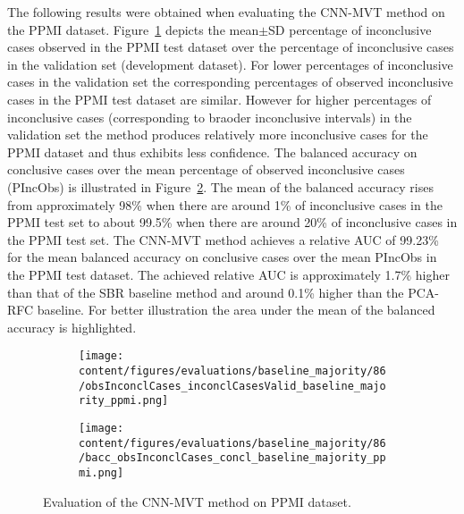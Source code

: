 The following results were obtained when evaluating the CNN-MVT method on the PPMI dataset.
Figure~\ref{fig:obsInconclCases_inconclCasesValid_baseline_majority_ppmi} depicts the
mean$\pm$SD percentage of inconclusive cases observed in the PPMI test dataset 
over the percentage of inconclusive cases in the validation set (development dataset).
For lower percentages of inconclusive cases in the validation set the corresponding 
percentages of observed inconclusive cases in the PPMI test dataset are similar.
However for higher percentages of inconclusive cases (corresponding to braoder inconclusive intervals) 
in the validation set the method produces relatively more inconclusive cases for the PPMI dataset 
and thus exhibits less confidence.
The balanced accuracy on conclusive cases over the mean percentage of observed inconclusive cases (PIncObs) is illustrated 
in Figure~\ref{fig:bacc_obsInconclCases_concl_baseline_majority_ppmi}.
The mean of the balanced accuracy rises from approximately 98\% 
when there are around 1\% of inconclusive cases in the PPMI test set to about 99.5\% 
when there are around 20\% of inconclusive cases in the PPMI test set.
The CNN-MVT method achieves a relative AUC of 99.23\% for the mean balanced accuracy on conclusive cases 
over the mean PIncObs in the PPMI test dataset.
The achieved relative AUC is approximately 1.7\% higher than that of the SBR baseline method 
and around 0.1\% higher than the PCA-RFC baseline.
For better illustration the area under the mean of the balanced accuracy is highlighted.


\begin{figure}[ht]
  \begin{subfigure}{0.9\textwidth}
    \centering
    \texttt{[image: content/figures/evaluations/baseline\_majority/86/obsInconclCases\_inconclCasesValid\_baseline\_majority\_ppmi.png]}
    \label{fig:obsInconclCases_inconclCasesValid_baseline_majority_ppmi}
  \end{subfigure}
  \hfill
  \begin{subfigure}{0.9\textwidth}
    \centering
    \texttt{[image: content/figures/evaluations/baseline\_majority/86/bacc\_obsInconclCases\_concl\_baseline\_majority\_ppmi.png]}
    \label{fig:bacc_obsInconclCases_concl_baseline_majority_ppmi}
  \end{subfigure}
  \caption{Evaluation of the CNN-MVT method on PPMI dataset.}
  \label{fig:perf_results_mvt_ppmi}
\end{figure}


